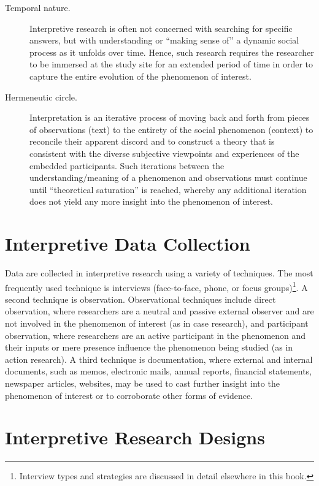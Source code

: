 \begin{description}
	\item[Temporal nature.] Interpretive research is often not concerned with searching for specific answers, but with understanding or ``making sense of'' a dynamic social process as it unfolds over time. Hence, such research requires the researcher to be immersed at the study site for an extended period of time in order to capture the entire evolution of the phenomenon of interest.

	\item[Hermeneutic circle.] Interpretation is an iterative process of moving back and forth from pieces of observations (text) to the entirety of the social phenomenon (context) to reconcile their apparent discord and to construct a theory that is consistent with the diverse subjective viewpoints and experiences of the embedded participants. Such iterations between the understanding/meaning of a phenomenon and observations must continue until ``theoretical saturation'' is reached, whereby any additional iteration does not yield any more insight into the phenomenon of interest.

\end{description}

\section{Interpretive Data Collection}

Data are collected in interpretive research using a variety of techniques. The most frequently used technique is interviews (face-to-face, phone, or focus groups)\footnote{Interview types and strategies are discussed in detail elsewhere in this book.}. A second technique is observation. Observational techniques include direct observation, where researchers are a neutral and passive external observer and are not involved in the phenomenon of interest (as in case research), and participant observation, where researchers are an active participant in the phenomenon and their inputs or mere presence influence the phenomenon being studied (as in action research). A third technique is documentation, where external and internal documents, such as memos, electronic mails, annual reports, financial statements, newspaper articles, websites, may be used to cast further insight into the phenomenon of interest or to corroborate other forms of evidence.

\section{Interpretive Research Designs}


